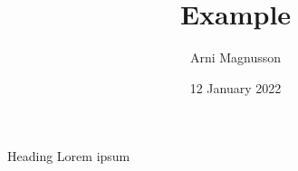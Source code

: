 \documentclass[aspectratio=169]{beamer}
\begin{document}
\begin{frame}
  \title{Example}
  \author{Arni Magnusson}
  \date{12 January 2022}
  \titlepage
\end{frame}

\begin{frame}{Heading}
  Lorem ipsum
\end{frame}
\end{document}
